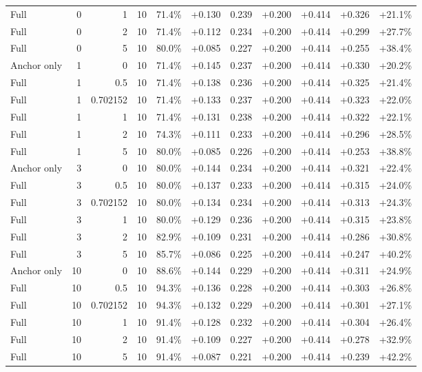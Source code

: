 \begin{table}[htbp]
\begin{tabular}{lrrrccccccc}
Full & 0 & 1 & 10 & 71.4\% & +0.130 & 0.239 & +0.200 & +0.414 & +0.326 & +21.1\% \\
Full & 0 & 2 & 10 & 71.4\% & +0.112 & 0.234 & +0.200 & +0.414 & +0.299 & +27.7\% \\
Full & 0 & 5 & 10 & 80.0\% & +0.085 & 0.227 & +0.200 & +0.414 & +0.255 & +38.4\% \\
Anchor only & 1 & 0 & 10 & 71.4\% & +0.145 & 0.237 & +0.200 & +0.414 & +0.330 & +20.2\% \\
Full & 1 & 0.5 & 10 & 71.4\% & +0.138 & 0.236 & +0.200 & +0.414 & +0.325 & +21.4\% \\
Full & 1 & 0.702152 & 10 & 71.4\% & +0.133 & 0.237 & +0.200 & +0.414 & +0.323 & +22.0\% \\
Full & 1 & 1 & 10 & 71.4\% & +0.131 & 0.238 & +0.200 & +0.414 & +0.322 & +22.1\% \\
Full & 1 & 2 & 10 & 74.3\% & +0.111 & 0.233 & +0.200 & +0.414 & +0.296 & +28.5\% \\
Full & 1 & 5 & 10 & 80.0\% & +0.085 & 0.226 & +0.200 & +0.414 & +0.253 & +38.8\% \\
Anchor only & 3 & 0 & 10 & 80.0\% & +0.144 & 0.234 & +0.200 & +0.414 & +0.321 & +22.4\% \\
Full & 3 & 0.5 & 10 & 80.0\% & +0.137 & 0.233 & +0.200 & +0.414 & +0.315 & +24.0\% \\
Full & 3 & 0.702152 & 10 & 80.0\% & +0.134 & 0.234 & +0.200 & +0.414 & +0.313 & +24.3\% \\
Full & 3 & 1 & 10 & 80.0\% & +0.129 & 0.236 & +0.200 & +0.414 & +0.315 & +23.8\% \\
Full & 3 & 2 & 10 & 82.9\% & +0.109 & 0.231 & +0.200 & +0.414 & +0.286 & +30.8\% \\
Full & 3 & 5 & 10 & 85.7\% & +0.086 & 0.225 & +0.200 & +0.414 & +0.247 & +40.2\% \\
Anchor only & 10 & 0 & 10 & 88.6\% & +0.144 & 0.229 & +0.200 & +0.414 & +0.311 & +24.9\% \\
Full & 10 & 0.5 & 10 & 94.3\% & +0.136 & 0.228 & +0.200 & +0.414 & +0.303 & +26.8\% \\
Full & 10 & 0.702152 & 10 & 94.3\% & +0.132 & 0.229 & +0.200 & +0.414 & +0.301 & +27.1\% \\
Full & 10 & 1 & 10 & 91.4\% & +0.128 & 0.232 & +0.200 & +0.414 & +0.304 & +26.4\% \\
Full & 10 & 2 & 10 & 91.4\% & +0.109 & 0.227 & +0.200 & +0.414 & +0.278 & +32.9\% \\
Full & 10 & 5 & 10 & 91.4\% & +0.087 & 0.221 & +0.200 & +0.414 & +0.239 & +42.2\% \\

\end{tabular}
\end{table}
